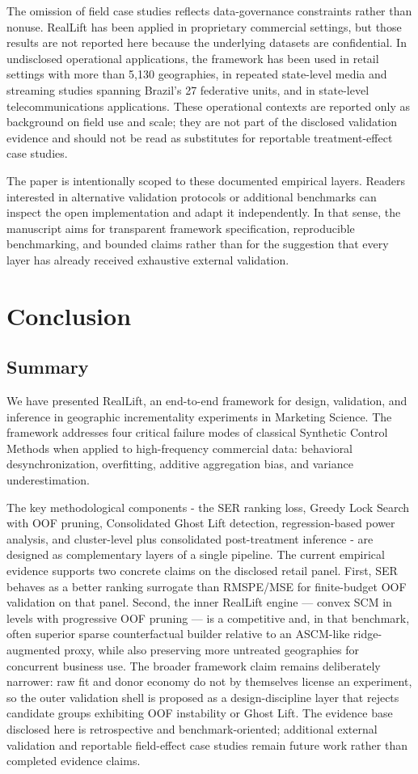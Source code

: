 \documentclass[11pt]{article}
\begin{document}
The omission of field case studies reflects data-governance constraints rather than nonuse. RealLift has been applied in proprietary commercial settings, but those results are not reported here because the underlying datasets are confidential. In undisclosed operational applications, the framework has been used in retail settings with more than 5{,}130 geographies, in repeated state-level media and streaming studies spanning Brazil's 27 federative units, and in state-level telecommunications applications. These operational contexts are reported only as background on field use and scale; they are not part of the disclosed validation evidence and should not be read as substitutes for reportable treatment-effect case studies.

The paper is intentionally scoped to these documented empirical layers. Readers interested in alternative validation protocols or additional benchmarks can inspect the open implementation and adapt it independently. In that sense, the manuscript aims for transparent framework specification, reproducible benchmarking, and bounded claims rather than for the suggestion that every layer has already received exhaustive external validation.

\section{Conclusion}
\subsection{Summary}
We have presented RealLift, an end-to-end framework for design, validation, and inference in geographic incrementality experiments in Marketing Science. The framework addresses four critical failure modes of classical Synthetic Control Methods when applied to high-frequency commercial data: behavioral desynchronization, overfitting, additive aggregation bias, and variance underestimation.

The key methodological components - the SER ranking loss, Greedy Lock Search with OOF pruning, Consolidated Ghost Lift detection, regression-based power analysis, and cluster-level plus consolidated post-treatment inference - are designed as complementary layers of a single pipeline. The current empirical evidence supports two concrete claims on the disclosed retail panel. First, SER behaves as a better ranking surrogate than RMSPE/MSE for finite-budget OOF validation on that panel. Second, the inner RealLift engine --- convex SCM in levels with progressive OOF pruning --- is a competitive and, in that benchmark, often superior sparse counterfactual builder relative to an ASCM-like ridge-augmented proxy, while also preserving more untreated geographies for concurrent business use. The broader framework claim remains deliberately narrower: raw fit and donor economy do not by themselves license an experiment, so the outer validation shell is proposed as a design-discipline layer that rejects candidate groups exhibiting OOF instability or Ghost Lift. The evidence base disclosed here is retrospective and benchmark-oriented; additional external validation and reportable field-effect case studies remain future work rather than completed evidence claims.
\end{document}
